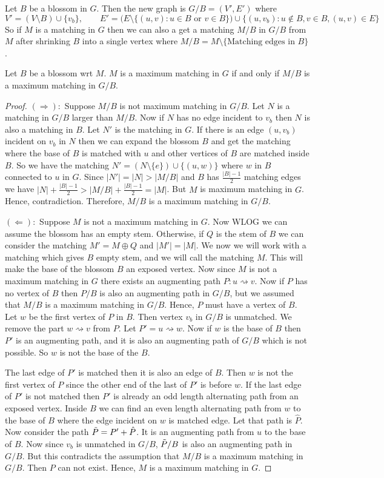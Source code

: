 Let $B$ be a blossom in $G$. Then the new graph is $G/B=(V',E')$ where $$V'=(V\setminus B)\cup \{v_b\},\qquad E'=\Big(E\setminus\{(u,v)\colon u\in B\text{ or }v\in B\}\Big)\cup \{(u,v_b)\colon u\notin B, v\in B, (u,v)\in E\}$$ So if $M$ is a matching in $G$ then we can also a get a matching $M/B$  in $G/B$ from $M$ after shrinking $B$ into  a single vertex where $M/B=M\setminus \{\text{Matching edges in $B$}\}$.
\begin{Theorem}{}{}
	Let $B$ be a blossom wrt $M$. $M$ is a maximum matching in $G$ if and only if $M/B$ is a maximum matching in $G/B$.
\end{Theorem}
\begin{proof}
	$(\Longrightarrow):$ Suppose $M/B$ is not maximum matching in $G/B$. Let $N$ is a matching in $G/B$ larger than $M/B$. Now if $N$ has no edge incident to $v_b$ then $N$ is also a matching in $B$. Let $N'$ is the matching in $G$. If there is an edge $(u,v_b)$ incident on $v_b$ in $N$ then we can expand the blossom $B$ and get the matching where the base of $B$ is matched with $u$ and other vertices of $B$ are matched inside $B$. So we have the matching $N'=(N\setminus\{e\})\cup \{(u,w)\}$ where $w$ in $B$ connected to $u$ in $G$. Since $|N'|=|N|>|M/B|$ and $B$ has $\frac{|B|-1}2$ matching edges we have $|N|+\frac{|B|-1}2>|M/B|+\frac{|B|-1}2=|M|$. But $M$ is maximum matching in $G$. Hence, contradiction. Therefore, $M/B$ is a maximum matching in $G/B$.

	$(\Longleftarrow):$ Suppose $M$ is not a maximum matching in $G$. Now WLOG we can assume the blossom has an empty stem. Otherwise, if $Q$ is the stem of $B$ we can consider the matching $M'=M\oplus Q$ and $|M'|=|M|$. We now we will work with a matching which gives $B$ empty stem, and we will call the matching $M$. This will make the base of the blossom $B$ an exposed vertex. Now since $M$ is not a maximum matching in $G$ there exists an augmenting path $P:u\rightsquigarrow v$. Now if $P$ has no vertex of $B$ then $P/B$ is also an augmenting path in $G/B$, but we assumed that $M/B$ is a maximum matching in $G/B$. Hence, $P$ must have a vertex of $B$. Let $w$ be the first vertex of $P$ in $B$. Then vertex $v_b$ in $G/B$ is unmatched. We remove the part $w\rightsquigarrow v$ from $P$. Let $P'=u\rightsquigarrow w$. Now if $w$ is the base of $B$ then $P'$ is an augmenting path, and it is also an augmenting path of $G/B$ which is not possible. So $w$ is not the base of the $B$.

	The last  edge of $P'$ is matched then it is also an edge of $B$. Then $w$ is not the first vertex of $P$ since the other end of the last of $P'$ is before $w$. If the last edge of $P'$ is not matched then $P'$ is already an odd length alternating path from an exposed vertex. Inside $B$ we can find an even length alternating path from $w$ to the base of $B$ where the edge incident on $w$ is matched edge. Let that path is $\hat{P}$. Now consider the path $\tilde{P}=P'+\hat{P}$. It is an augmenting path from $u$ to the base of $B$. Now since $v_b$ is unmatched in $G/B$, $\tilde{P}/B$ is also an augmenting path in $G/B$. But this contradicts the assumption that $M/B$ is a maximum matching in $G/B$. Then $P$ can not exist. Hence, $M$ is a maximum matching in $G$.
\end{proof}

